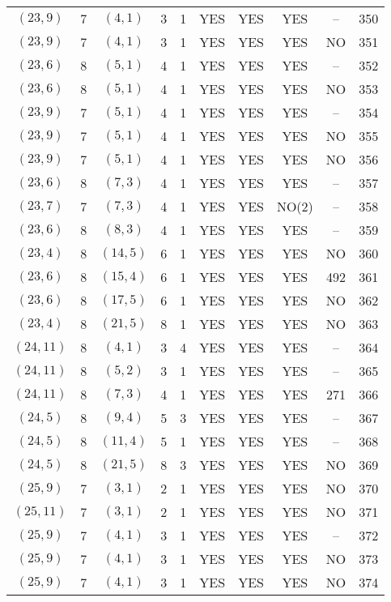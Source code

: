 \begin{longtable}{|c|c|c|c|c|c|c|c|c|c|}
$(23, 9)$ & 7 & $(4, 1)$ & 3 & 1 & YES & YES & YES & -- & 350\\
$(23, 9)$ & 7 & $(4, 1)$ & 3 & 1 & YES & YES & YES & NO & 351\\
$(23, 6)$ & 8 & $(5, 1)$ & 4 & 1 & YES & YES & YES & -- & 352\\
$(23, 6)$ & 8 & $(5, 1)$ & 4 & 1 & YES & YES & YES & NO & 353\\
$(23, 9)$ & 7 & $(5, 1)$ & 4 & 1 & YES & YES & YES & -- & 354\\
$(23, 9)$ & 7 & $(5, 1)$ & 4 & 1 & YES & YES & YES & NO & 355\\
$(23, 9)$ & 7 & $(5, 1)$ & 4 & 1 & YES & YES & YES & NO & 356\\
$(23, 6)$ & 8 & $(7, 3)$ & 4 & 1 & YES & YES & YES & -- & 357\\
$(23, 7)$ & 7 & $(7, 3)$ & 4 & 1 & YES & YES & NO(2) & -- & 358\\
$(23, 6)$ & 8 & $(8, 3)$ & 4 & 1 & YES & YES & YES & -- & 359\\
$(23, 4)$ & 8 & $(14, 5)$ & 6 & 1 & YES & YES & YES & NO & 360\\
$(23, 6)$ & 8 & $(15, 4)$ & 6 & 1 & YES & YES & YES & 492 & 361\\
$(23, 6)$ & 8 & $(17, 5)$ & 6 & 1 & YES & YES & YES & NO & 362\\
$(23, 4)$ & 8 & $(21, 5)$ & 8 & 1 & YES & YES & YES & NO & 363\\
$(24, 11)$ & 8 & $(4, 1)$ & 3 & 4 & YES & YES & YES & -- & 364\\
$(24, 11)$ & 8 & $(5, 2)$ & 3 & 1 & YES & YES & YES & -- & 365\\
$(24, 11)$ & 8 & $(7, 3)$ & 4 & 1 & YES & YES & YES & 271 & 366\\
$(24, 5)$ & 8 & $(9, 4)$ & 5 & 3 & YES & YES & YES & -- & 367\\
$(24, 5)$ & 8 & $(11, 4)$ & 5 & 1 & YES & YES & YES & -- & 368\\
$(24, 5)$ & 8 & $(21, 5)$ & 8 & 3 & YES & YES & YES & NO & 369\\
$(25, 9)$ & 7 & $(3, 1)$ & 2 & 1 & YES & YES & YES & NO & 370\\
$(25, 11)$ & 7 & $(3, 1)$ & 2 & 1 & YES & YES & YES & NO & 371\\
$(25, 9)$ & 7 & $(4, 1)$ & 3 & 1 & YES & YES & YES & -- & 372\\
$(25, 9)$ & 7 & $(4, 1)$ & 3 & 1 & YES & YES & YES & NO & 373\\
$(25, 9)$ & 7 & $(4, 1)$ & 3 & 1 & YES & YES & YES & NO & 374\\

\end{longtable}
